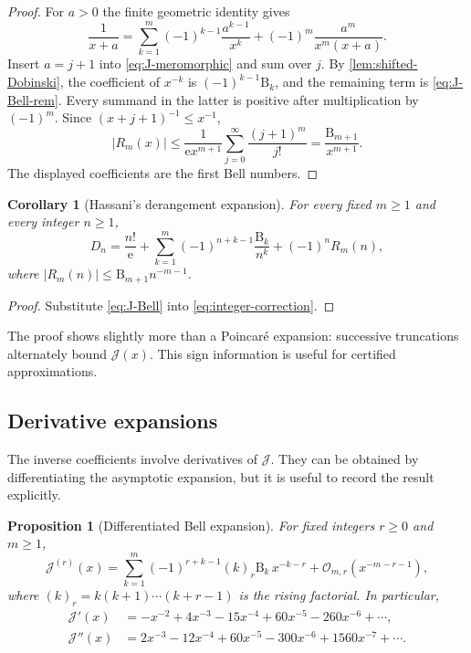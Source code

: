 \documentclass[11pt,a4paper]{article}
\numberwithin{equation}{section}
\newtheorem{proposition}[theorem]{Proposition}
\newtheorem{corollary}[theorem]{Corollary}
\theoremstyle{definition}
\theoremstyle{remark}
\newcommand{\e}{\mathrm e}
\newcommand{\Ord}{\mathcal O}
\newcommand{\Bell}{\mathrm B}
\newcommand{\Tail}{\mathcal J}
\begin{document}
\begin{proof}
For $a>0$ the finite geometric identity gives
\begin{equation}\label{eq:reciprocal-finite}
 \frac1{x+a}=\sum_{k=1}^{m}(-1)^{k-1}\frac{a^{k-1}}{x^k}
 +(-1)^m\frac{a^m}{x^m(x+a)}.
\end{equation}
Insert $a=j+1$ into \eqref{eq:J-meromorphic} and sum over $j$.  By
\cref{lem:shifted-Dobinski}, the coefficient of $x^{-k}$ is
$(-1)^{k-1}\Bell_k$, and the remaining term is
\eqref{eq:J-Bell-rem}.  Every summand in the latter is positive after
multiplication by $(-1)^m$.  Since $(x+j+1)^{-1}\le x^{-1}$,
\[
 |R_m(x)|\le\frac1{\e x^{m+1}}
 \sum_{j=0}^{\infty}\frac{(j+1)^m}{j!}
 =\frac{\Bell_{m+1}}{x^{m+1}}.
\]
The displayed coefficients are the first Bell numbers.
\end{proof}

\begin{corollary}[Hassani's derangement expansion]\label{cor:Hassani}
For every fixed $m\ge1$ and every integer $n\ge1$,
\begin{equation}\label{eq:Hassani-derived}
 D_n=\frac{n!}{\e}
 +\sum_{k=1}^{m}(-1)^{n+k-1}\frac{\Bell_k}{n^k}
 +(-1)^nR_m(n),
\end{equation}
where $|R_m(n)|\le \Bell_{m+1}n^{-m-1}$.
\end{corollary}

\begin{proof}
Substitute \eqref{eq:J-Bell} into \eqref{eq:integer-correction}.
\end{proof}

The proof shows slightly more than a Poincar\'e expansion: successive
truncations alternately bound $\Tail(x)$.  This sign information is useful
for certified approximations.

\subsection{Derivative expansions}

The inverse coefficients involve derivatives of $\Tail$.  They can be
obtained by differentiating the asymptotic expansion, but it is useful to
record the result explicitly.

\begin{proposition}[Differentiated Bell expansion]\label{prop:J-derivatives}
For fixed integers $r\ge0$ and $m\ge1$,
\begin{equation}\label{eq:J-derivative-Bell}
 \Tail^{(r)}(x)
 =\sum_{k=1}^{m}(-1)^{r+k-1}(k)_r\Bell_k\,x^{-k-r}
 +\Ord_{m,r}(x^{-m-r-1}),
\end{equation}
where $(k)_r=k(k+1)\cdots(k+r-1)$ is the rising factorial.  In particular,
\begin{align}
 \Tail'(x)&=-x^{-2}+4x^{-3}-15x^{-4}+60x^{-5}
            -260x^{-6}+\cdots,\label{eq:Jprime-first}\\
 \Tail''(x)&=2x^{-3}-12x^{-4}+60x^{-5}-300x^{-6}
            +1560x^{-7}+\cdots.\label{eq:Jsecond-first}
\end{align}
\end{proposition}
\end{document}
